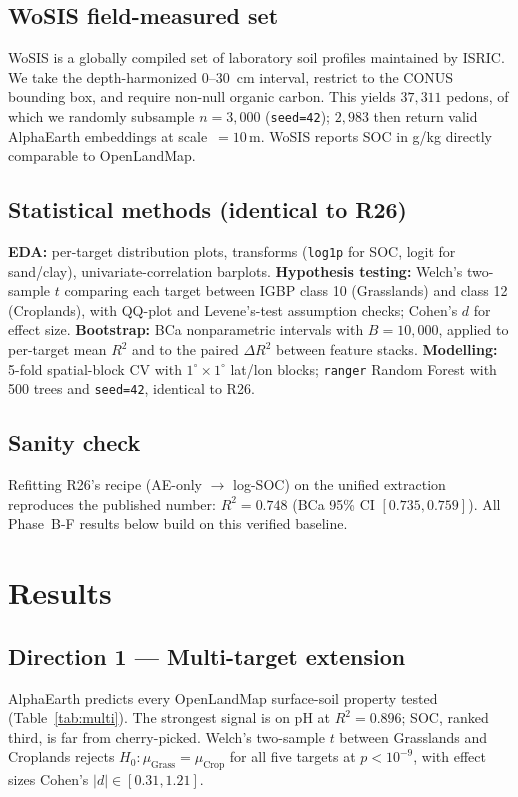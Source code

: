 \documentclass[11pt]{article}
\begin{document}
\subsection{WoSIS field-measured set}
WoSIS \cite{batjes2020wosis} is a globally compiled set of laboratory
soil profiles maintained by ISRIC. We take the depth-harmonized 0--30~cm
interval, restrict to the CONUS bounding box, and require non-null
organic carbon. This yields $37{,}311$ pedons, of which we randomly
subsample $n = 3{,}000$ (\texttt{seed=42}); $2{,}983$ then return valid
AlphaEarth embeddings at scale~$=10$\,m. WoSIS reports SOC in g/kg
directly comparable to OpenLandMap.

\subsection{Statistical methods (identical to R26)}
\textbf{EDA:} per-target distribution plots, transforms (\texttt{log1p}
for SOC, logit for sand/clay), univariate-correlation barplots.
\textbf{Hypothesis testing:} Welch's two-sample $t$ \cite{welch1947t}
comparing each target between IGBP class 10 (Grasslands) and class 12
(Croplands), with QQ-plot and Levene's-test assumption checks; Cohen's
$d$ for effect size. \textbf{Bootstrap:} BCa nonparametric intervals
\cite{efron1979bootstrap, canty2024boot} with $B = 10{,}000$, applied to
per-target mean $R^2$ and to the paired $\Delta R^2$ between feature
stacks. \textbf{Modelling:} 5-fold spatial-block CV with
$1^\circ \times 1^\circ$ lat/lon blocks; \texttt{ranger}
\cite{wright2017ranger} Random Forest with 500 trees and
\texttt{seed=42}, identical to R26.

\subsection{Sanity check}
Refitting R26's recipe (AE-only $\to$ log-SOC) on the unified
extraction reproduces the published number: $R^2 = 0.748$
(BCa 95\% CI $[0.735, 0.759]$). All Phase~B-F results below build on
this verified baseline.

\section{Results}

\subsection{Direction 1 --- Multi-target extension}
AlphaEarth predicts every OpenLandMap surface-soil property tested
(Table~\ref{tab:multi}). The strongest signal is on pH at $R^2 = 0.896$;
SOC, ranked third, is far from cherry-picked. Welch's two-sample $t$
between Grasslands and Croplands rejects $H_0: \mu_{\text{Grass}} =
\mu_{\text{Crop}}$ for all five targets at $p < 10^{-9}$, with effect
sizes Cohen's $|d| \in [0.31, 1.21]$.
\end{document}
